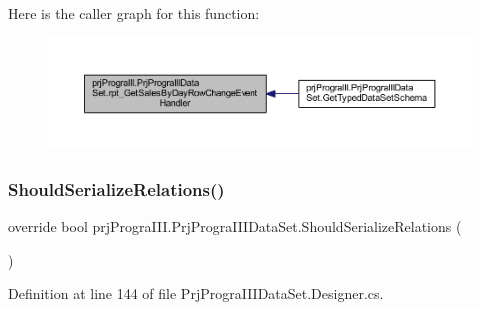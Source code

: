 Here is the caller graph for this function\+:
\nopagebreak
\begin{figure}[H]
\begin{center}
\leavevmode
\includegraphics[width=350pt]{classprj_progra_i_i_i_1_1_prj_progra_i_i_i_data_set_aa1d46bd3c23f7f4fb63afc2bdb363a5b_icgraph}
\end{center}
\end{figure}
\hypertarget{classprj_progra_i_i_i_1_1_prj_progra_i_i_i_data_set_a8badd38e1dc1ec5999199bdd0f3ac5b0}{}\label{classprj_progra_i_i_i_1_1_prj_progra_i_i_i_data_set_a8badd38e1dc1ec5999199bdd0f3ac5b0} 
\subsubsection{\texorpdfstring{Should\+Serialize\+Relations()}{ShouldSerializeRelations()}}
{\footnotesize\ttfamily override bool prj\+Progra\+I\+I\+I.\+Prj\+Progra\+I\+I\+I\+Data\+Set.\+Should\+Serialize\+Relations (\begin{DoxyParamCaption}{ }\end{DoxyParamCaption})\hspace{0.3cm}{\ttfamily [protected]}}



Definition at line 144 of file Prj\+Progra\+I\+I\+I\+Data\+Set.\+Designer.\+cs.

\hypertarget{classprj_progra_i_i_i_1_1_prj_progra_i_i_i_data_set_a48de6e236e01ba517b1fab0450329d98}{}\label{classprj_progra_i_i_i_1_1_prj_progra_i_i_i_data_set_a48de6e236e01ba517b1fab0450329d98} 

